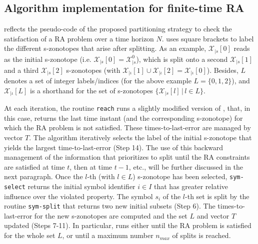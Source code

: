 \documentclass[journal]{IEEEtran}
\begin{document}

\subsection{Algorithm implementation for finite-time RA} \label{sec:implementation_part}

 reflects the pseudo-code of the proposed partitioning strategy to check the satisfaction of a RA problem over a time horizon $N$.  uses square brackets to label the different s-zonotopes that arise after splitting. As an example, $\mathcal{X}_{|s}[0]$ reads as the initial s-zonotope (i.e. $\mathcal{X}_{|s}[0] = \mathcal{X}_{|s}^0$), which is split onto a second $\mathcal{X}_{|s}[1]$ and a third $\mathcal{X}_{|s}[2]$ s-zonotopes (with $\mathcal{X}_{|\iota}[1] \cup \mathcal{X}_{|\iota}[2] = \mathcal{X}_{|\iota}[0]$). Besides, $L$ denotes a set of integer labels/indices (for the above example $L = \{0,1,2\}$), and $\mathcal{X}_{|\iota}[L]$ is a shorthand for the set of s-zonotopes $\{\mathcal{X}_{|s}[l] \, | \,  l \in L\}$.

At each iteration, the routine \texttt{reach} runs a slightly modified version of , that, in this case, returns the last time instant (and the corresponding s-zonotope) for which the RA problem is not satisfied. These times-to-last-error are managed by vector $T$. The algorithm iteratively selects the label of the initial s-zonotope that yields the largest time-to-last-error (Step 14). The use of this backward management of the information that prioritizes to split
until %
the RA constraints are satisfied at time  $t$, then at time $t -1$, etc., will be further discussed in the next paragraph. Once the $l$-th (with $l \in L$) s-zonotope has been selected, \texttt{sym-select} returns the initial symbol identifier $i \in I$ that has greater relative influence over the violated property. The symbol $s_i$ of the $l$-th set is split by the routine \texttt{sym-split} that returns two new initial subsets (Step 6).  The times-to-last-error for the new s-zonotopes are computed and the set $L$ and vector $T$ updated (Steps 7-11). In particular,  runs either until the RA problem is satisfied for the whole set $L$, or until a maximum number $n_{max}$ of splits is reached.
\end{document}
